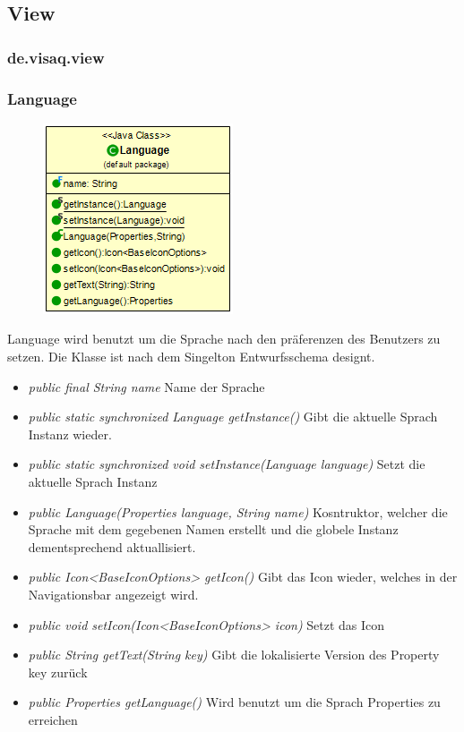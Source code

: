 \subsection{View}



\subsubsection{de.visaq.view}

\subsubsection {Language}
\begin{minipage}{0.3\textwidth}
    \begin{figure}[H]
        \includegraphics[scale = 0.5
        ]{media/view/view/Language_Class.png}
    \end{figure}
    \end{minipage} \hfill
    \begin{minipage}{0.6\textwidth}
    Language wird benutzt um die Sprache nach den präferenzen des Benutzers zu setzen. Die Klasse ist nach dem Singelton Entwurfsschema designt.
    \end{minipage}
    \begin{itemize} [noitemsep]
    \item \emph{public final String name} Name der Sprache
    \item \emph{public static synchronized Language getInstance()} Gibt die aktuelle Sprach Instanz wieder.
    \item \emph{public static synchronized void setInstance(Language language)} Setzt die aktuelle Sprach Instanz
    \item \emph{public Language(Properties language, String name)} Kosntruktor, welcher die Sprache mit dem gegebenen Namen erstellt und die globele Instanz dementsprechend aktuallisiert.
    \item \emph{public Icon<BaseIconOptions> getIcon()} Gibt das Icon wieder, welches in der Navigationsbar angezeigt wird.
    \item \emph{public void setIcon(Icon<BaseIconOptions> icon)} Setzt das Icon
    \item \emph{public String getText(String key)} Gibt die lokalisierte Version des Property key zurück
    \item \emph{public Properties getLanguage()} Wird benutzt um die Sprach Properties zu erreichen
\end{itemize}

